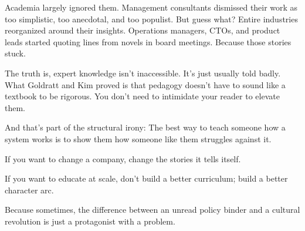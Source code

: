 \medskip

Academia largely ignored them. Management consultants dismissed their work as too simplistic, too anecdotal, and too populist.
But guess what?
Entire industries reorganized around their insights.
Operations managers, CTOs, and product leads started quoting lines from novels in board meetings.
Because those stories stuck.

The truth is, expert knowledge isn’t inaccessible.
It’s just usually told badly.
What Goldratt and Kim proved is that pedagogy doesn’t have to sound like a textbook to be rigorous.
You don’t need to intimidate your reader to elevate them.

And that’s part of the structural irony:
The best way to teach someone how a system works is to show them how someone like them struggles against it.

If you want to change a company, change the stories it tells itself.

If you want to educate at scale, don’t build a better curriculum; build a better character arc.

Because sometimes, the difference between an unread policy binder and a cultural revolution is just a protagonist with a problem.